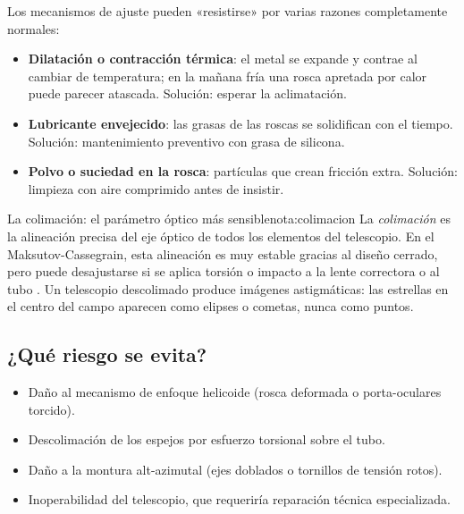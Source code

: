 \documentclass[12pt,oneside]{book}
\begin{document}
Los mecanismos de ajuste pueden «resistirse» por varias razones completamente normales:

\begin{itemize}[leftmargin=1.5em]
    \item \textbf{Dilatación o contracción térmica}: el metal se expande y contrae
          al cambiar de temperatura; en la mañana fría una rosca apretada por calor
          puede parecer atascada. Solución: esperar la aclimatación.
    \item \textbf{Lubricante envejecido}: las grasas de las roscas se solidifican
          con el tiempo. Solución: mantenimiento preventivo con grasa de silicona.
    \item \textbf{Polvo o suciedad en la rosca}: partículas que crean fricción extra.
          Solución: limpieza con aire comprimido antes de insistir.
\end{itemize}

\begin{nota}{La colimación: el parámetro óptico más sensible}{nota:colimacion}
    La \emph{colimación} es la alineación precisa del eje óptico de todos los
    elementos del telescopio. En el Maksutov-Cassegrain, esta alineación es muy
    estable gracias al diseño cerrado, pero puede desajustarse si se aplica
    torsión o impacto a la lente correctora o al tubo \cite{suiter1994}. Un
    telescopio descolimado produce imágenes astigmáticas: las estrellas en el
    centro del campo aparecen como elipses o cometas, nunca como puntos.
\end{nota}

\subsection{¿Qué riesgo se evita?}

\begin{itemize}[leftmargin=1.5em]
    \item Daño al mecanismo de enfoque helicoide (rosca deformada o porta-oculares torcido).
    \item Descolimación de los espejos por esfuerzo torsional sobre el tubo.
    \item Daño a la montura alt-azimutal (ejes doblados o tornillos de tensión rotos).
    \item Inoperabilidad del telescopio, que requeriría reparación técnica especializada.
\end{itemize}
\end{document}

